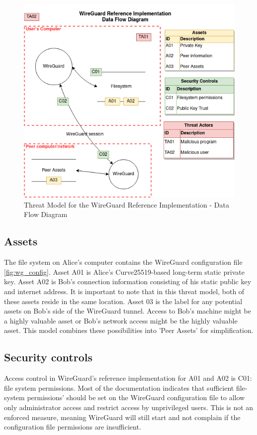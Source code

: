 \documentclass [11pt, proquest] {uwthesis}[2020/02/24]
\begin{document}
\begin{figure}[ht]
\includegraphics[width=14cm]{paper/images/WGH_DFD.drawio.png}
\caption{Threat Model for the WireGuard Reference Implementation - Data Flow Diagram}
\label{fig:wg_ref_dfd}
\end{figure}

\subsection{Assets}
The file system on Alice's computer contains the WireGuard configuration file \ref{fig:wg_config}. 
Asset A01 is Alice's Curve25519-based long-term static private key. Asset A02 is Bob's connection information consisting of his static public key and internet address. It is important to note that in this threat model, both of these assets reside in the same location. 
Asset 03 is the label for any potential assets on Bob's side of the WireGuard tunnel. Access to Bob's machine might be a highly valuable asset or Bob's network access might be the highly valuable asset. This model combines these possibilities into 'Peer Assets' for simplification.

\subsection{Security controls}
Access control in WireGuard's reference implementation for A01 and A02 is C01: file system permissions. Most of the documentation indicates that sufficient file-system permissions' should be set on the WireGuard configuration file to allow only administrator access and restrict access by unprivileged users. This is not an enforced measure, meaning WireGuard will still start and not complain if the configuration file permissions are insufficient. 
\end{document}
